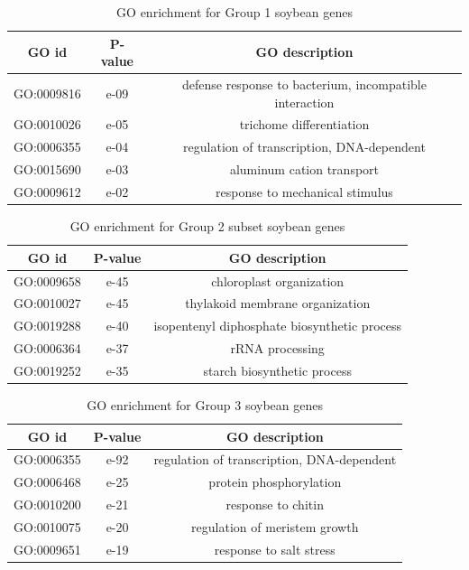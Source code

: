 \documentclass{article}
\begin{document}
		\begin{table}[h!]
			\centering
			\begin{tabular}{|c |c |c |} 
				\hline
				GO id & P-value & GO description \\
				\hline\hline
				GO:0009816 & e-09 & defense response to bacterium, incompatible interaction \\ 
				\hline
				GO:0010026 & e-05 & trichome differentiation \\
				\hline
				GO:0006355 & e-04 & regulation of transcription, DNA-dependent \\
				\hline
				GO:0015690 & e-03 & aluminum cation transport \\
				\hline
				GO:0009612 & e-02 & response to mechanical stimulus \\ 
				\hline
			\end{tabular}
			\caption{GO enrichment for Group 1 soybean genes}
			\label{tab:gotable_group1}
		\end{table}
		
		\begin{table}[h!]
			\centering
			\begin{tabular}{|c |c |c |} 
				\hline
				GO id & P-value & GO description \\
				\hline\hline
				GO:0009658 & e-45 & chloroplast organization \\ 
				\hline
				GO:0010027 & e-45 & thylakoid membrane organization \\
				\hline
				GO:0019288 & e-40 & isopentenyl diphosphate biosynthetic process \\
				\hline
				GO:0006364 & e-37 & rRNA processing \\
				\hline
				GO:0019252 & e-35 & starch biosynthetic process \\ 
				\hline
			\end{tabular}
			\caption{GO enrichment for Group 2 subset soybean genes}
			\label{tab:gotable_group2_subset}
		\end{table}
		
		\begin{table}[h!]
			\centering
			\begin{tabular}{|c |c |c |} 
				\hline
				GO id & P-value & GO description \\
				\hline\hline
				GO:0006355 & e-92 & regulation of transcription, DNA-dependent \\ 
				\hline
				GO:0006468 & e-25 & protein phosphorylation \\
				\hline
				GO:0010200 & e-21 & response to chitin \\
				\hline
				GO:0010075 & e-20 & regulation of meristem growth \\
				\hline
				GO:0009651 & e-19 & response to salt stress \\ 
				\hline
			\end{tabular}
			\caption{GO enrichment for Group 3 soybean genes}
			\label{tab:gotable_group3}
		\end{table}
		
\end{document}
